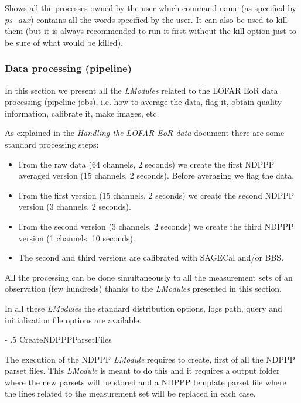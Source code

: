 \documentclass[a4paper,11pt]{article}
\makeatletter
\renewcommand\paragraph{%
   \@startsection{paragraph}{4}{0mm}%
      {-\baselineskip}%
      {.5\baselineskip}%
      {\normalfont\normalsize\bfseries}}
\makeatother
\begin{document}
Shows all the processes owned by the user which command name (as specified by \textit{ps -aux}) contains all the words specified by the user. It can also be used to kill them (but it is always recommended to run it first without the kill option just to be sure of what would be killed).

\subsubsection{Data processing (pipeline)}

In this section we present all the \textit{LModules} related to the LOFAR EoR data processing (pipeline jobs), i.e. how to average the data, flag it, obtain quality information, calibrate it, make images, etc.

As explained in the \textit{Handling the LOFAR EoR data} document there are some standard processing steps:

\begin{itemize}
    \item From the raw data (64 channels, 2 seconds) we create the first NDPPP averaged version (15 channels, 2 seconds). Before averaging we flag the data.
    \item From the first version (15 channels, 2 seconds) we create the second NDPPP version (3 channels, 2 seconds).
    \item From the second version (3 channels, 2 seconds) we create the third NDPPP version (1 channels, 10 seconds).   
    \item The second and third versions are calibrated with SAGECal and/or BBS.
\end{itemize}

All the processing can be done simultaneously to all the measurement sets of an observation (few hundreds) thanks to the \textit{LModules} presented in this section.

In all these \textit{LModules} the standard distribution options, logs path, query and initialization file options are available.

\paragraph{CreateNDPPPParsetFiles}

The execution of the NDPPP \textit{LModule} requires to create, first of all the NDPPP parset files. This \textit{LModule} is meant to do this and it requires a output folder where the new parsets will be stored and a NDPPP template parset file where the lines related to the measurement set will be replaced in each case.
\end{document}
